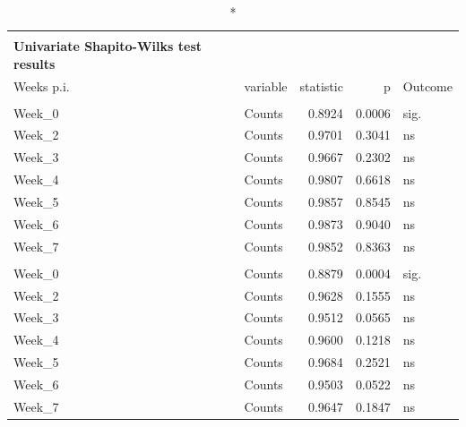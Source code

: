 \documentclass[
  12pt,
  letterpaper,
]{article}
\begin{document}
\begingroup
\fontsize{12.0pt}{14.4pt}\selectfont
\begin{longtable}{l|lrrl}
\caption*{
{\large \textbf{Appendix Table 160}} \\ 
{\small \textbf{Univariate Shapito-Wilks test results}}
} \\ 
\toprule
Weeks p.i. & {variable} & {statistic} & {p} & {Outcome} \\ 
\midrule\addlinespace[2.5pt]
\multicolumn{5}{l}{WN} \\[2.5pt] 
\midrule\addlinespace[2.5pt]
Week\_0 & Counts & 0.8924 & 0.0006 & sig. \\ 
Week\_2 & Counts & 0.9701 & 0.3041 & ns \\ 
Week\_3 & Counts & 0.9667 & 0.2302 & ns \\ 
Week\_4 & Counts & 0.9807 & 0.6618 & ns \\ 
Week\_5 & Counts & 0.9857 & 0.8545 & ns \\ 
Week\_6 & Counts & 0.9873 & 0.9040 & ns \\ 
Week\_7 & Counts & 0.9852 & 0.8363 & ns \\ 
\midrule\addlinespace[2.5pt]
\multicolumn{5}{l}{MN} \\[2.5pt] 
\midrule\addlinespace[2.5pt]
Week\_0 & Counts & 0.8879 & 0.0004 & sig. \\ 
Week\_2 & Counts & 0.9628 & 0.1555 & ns \\ 
Week\_3 & Counts & 0.9512 & 0.0565 & ns \\ 
Week\_4 & Counts & 0.9600 & 0.1218 & ns \\ 
Week\_5 & Counts & 0.9684 & 0.2521 & ns \\ 
Week\_6 & Counts & 0.9503 & 0.0522 & ns \\ 
Week\_7 & Counts & 0.9647 & 0.1847 & ns \\ 
\bottomrule
\end{longtable}
\endgroup
\end{document}
